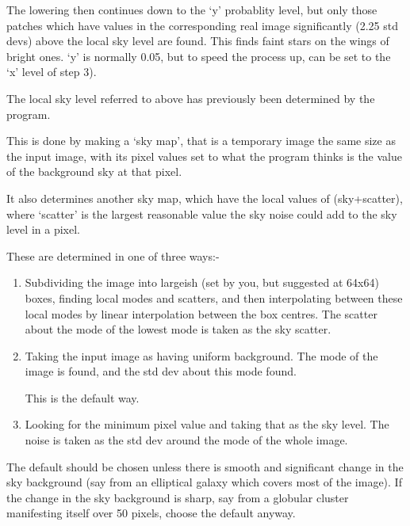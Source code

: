 \begin{small}
{{    The lowering then continues down to the `y' probablity level,
    but only those patches which have values in the corresponding
    real image significantly (2.25 std devs) above the local sky
    level are found. This finds faint stars on the wings of bright
    ones. `y' is normally 0.05, but to speed the process up, can
    be set to the `x' level of step 3).
 
 \vspace*{1mm}
 \hspace*{2em}{\bf Sky}
 \vspace*{1mm}
 
 The local sky level referred to above has previously been
 determined by the program.
 
 This is done by making a `sky map', that is a temporary image the
 same size as the input image, with its pixel values set to what the
 program thinks is the value of the background sky at that pixel.
 
 It also determines another sky map, which have the local values of
 (sky+scatter), where `scatter' is the largest reasonable value the
 sky noise could add to the sky level in a pixel.
 
 These are determined in one of three ways:-
 
 \begin{enumerate}
  \item Subdividing the image into largeish (set by you, but suggested
    at 64x64) boxes, finding local modes and scatters, and then
    interpolating between these local modes by linear interpolation
    between the box centres. The scatter about the
    mode of the lowest mode is taken as the sky scatter.
 
  \item Taking the input image as having uniform background. The mode of
        the image is found, and the std dev about this mode found.
 
        This is the default way.
 
  \item Looking for the minimum pixel value and taking that as the sky
    level. The noise is taken as the std dev around the mode of the whole
    image.
 
\end{enumerate}
 
 The default should be chosen unless there is smooth and
 significant change in the sky background (say from an elliptical
 galaxy which covers most of the image). If the
 change in the sky background is sharp, say from a globular cluster
 manifesting itself over 50 pixels, choose the default anyway.
 
}}
\end{small}
